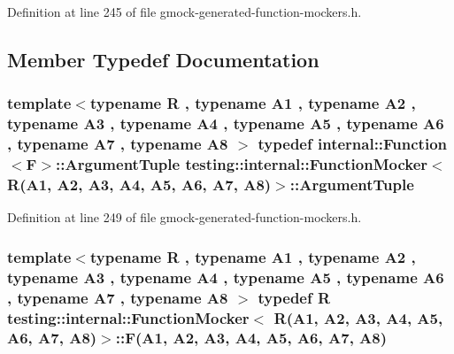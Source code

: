 Definition at line 245 of file gmock-\/generated-\/function-\/mockers.\+h.



\subsection{Member Typedef Documentation}
\subsubsection[{\texorpdfstring{Argument\+Tuple}{ArgumentTuple}}]{\setlength{\rightskip}{0pt plus 5cm}template$<$typename R , typename A1 , typename A2 , typename A3 , typename A4 , typename A5 , typename A6 , typename A7 , typename A8 $>$ typedef {\bf internal\+::\+Function}$<${\bf F}$>$\+::{\bf Argument\+Tuple} {\bf testing\+::internal\+::\+Function\+Mocker}$<$ {\bf R}(A1, A2, A3, A4, A5, A6, A7, A8)$>$\+::{\bf Argument\+Tuple}}\hypertarget{classtesting_1_1internal_1_1_function_mocker_3_01_r_07_a1_00_01_a2_00_01_a3_00_01_a4_00_01_a5_00_01_a6_00_01_a7_00_01_a8_08_4_a57bc2be00815deac8964e2d2ae62fdd2}{}\label{classtesting_1_1internal_1_1_function_mocker_3_01_r_07_a1_00_01_a2_00_01_a3_00_01_a4_00_01_a5_00_01_a6_00_01_a7_00_01_a8_08_4_a57bc2be00815deac8964e2d2ae62fdd2}


Definition at line 249 of file gmock-\/generated-\/function-\/mockers.\+h.

\subsubsection[{\texorpdfstring{F}{F}}]{\setlength{\rightskip}{0pt plus 5cm}template$<$typename R , typename A1 , typename A2 , typename A3 , typename A4 , typename A5 , typename A6 , typename A7 , typename A8 $>$ typedef {\bf R} {\bf testing\+::internal\+::\+Function\+Mocker}$<$ {\bf R}(A1, A2, A3, A4, A5, A6, A7, A8)$>$\+::F(A1, A2, A3, A4, A5, A6, A7, A8)}\hypertarget{classtesting_1_1internal_1_1_function_mocker_3_01_r_07_a1_00_01_a2_00_01_a3_00_01_a4_00_01_a5_00_01_a6_00_01_a7_00_01_a8_08_4_ad9749c93b0a17540778c5fa162a5fe6c}{}\label{classtesting_1_1internal_1_1_function_mocker_3_01_r_07_a1_00_01_a2_00_01_a3_00_01_a4_00_01_a5_00_01_a6_00_01_a7_00_01_a8_08_4_ad9749c93b0a17540778c5fa162a5fe6c}


